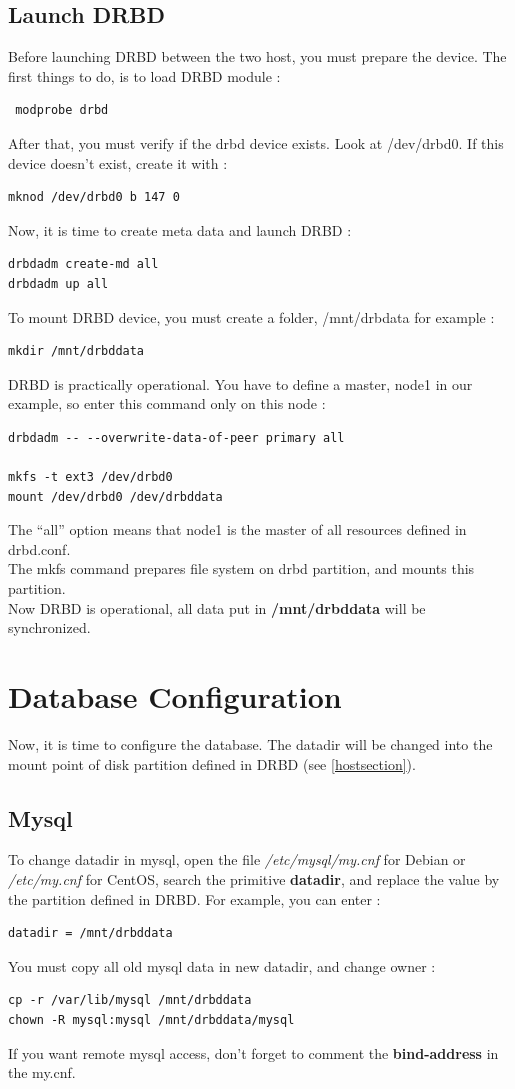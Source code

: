\documentclass[a4paper,10pt]{report}
\begin{document}
\subsection{Launch DRBD}
Before launching DRBD between the two host, you must prepare the device. The first things to do, is to load DRBD module :
\begin{lstlisting}
 modprobe drbd
\end{lstlisting}
After that, you must verify if the drbd device exists. Look at /dev/drbd0. If this device doesn't exist, create it with :
\begin{lstlisting}
mknod /dev/drbd0 b 147 0
\end{lstlisting}
Now, it is time to create meta data and launch DRBD :
\begin{lstlisting}
drbdadm create-md all
drbdadm up all
\end{lstlisting}
To mount DRBD device, you must create a folder, /mnt/drbdata for example :
\begin{lstlisting}
mkdir /mnt/drbddata
\end{lstlisting}
DRBD is practically operational. You have to define a master, node1 in our example, so enter this command only on this node :
\begin{lstlisting}
drbdadm -- --overwrite-data-of-peer primary all

mkfs -t ext3 /dev/drbd0
mount /dev/drbd0 /dev/drbddata
\end{lstlisting}
The ``all'' option means that node1 is the master of all resources defined in drbd.conf.\\
The mkfs command prepares file system on drbd partition, and mounts this partition.\\
Now DRBD is operational, all data put in \textbf{/mnt/drbddata} will be synchronized.




\section{Database Configuration}
Now, it is time to configure the database. The datadir will be changed into the  mount point of disk partition defined in DRBD (see  \ref{hostsection}).

\subsection{Mysql}
To change datadir in mysql, open the file \textit{/etc/mysql/my.cnf} for Debian or \textit{/etc/my.cnf} for CentOS, search the primitive \textbf{datadir}, and replace the value by the partition defined in DRBD.
For example, you can enter :
\begin{lstlisting}
datadir = /mnt/drbddata
\end{lstlisting}
You must copy all old mysql data in new datadir, and change owner :
\begin{lstlisting}
cp -r /var/lib/mysql /mnt/drbddata
chown -R mysql:mysql /mnt/drbddata/mysql
\end{lstlisting}
If you want remote mysql access, don't forget to comment the \textbf{bind-address} in the my.cnf.\\
\end{document}
